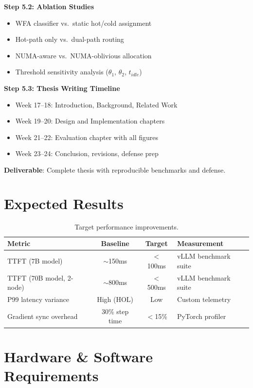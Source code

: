 \documentclass[10pt,letterpaper]{article}
\begin{document}
\textbf{Step 5.2: Ablation Studies}
\begin{itemize}[noitemsep]
    \item WFA classifier vs.\ static hot/cold assignment
    \item Hot-path only vs.\ dual-path routing
    \item NUMA-aware vs.\ NUMA-oblivious allocation
    \item Threshold sensitivity analysis ($\theta_1$, $\theta_2$, $t_{idle}$)
\end{itemize}

\textbf{Step 5.3: Thesis Writing Timeline}
\begin{itemize}[noitemsep]
    \item Week 17--18: Introduction, Background, Related Work
    \item Week 19--20: Design and Implementation chapters
    \item Week 21--22: Evaluation chapter with all figures
    \item Week 23--24: Conclusion, revisions, defense prep
\end{itemize}

\textbf{Deliverable}: Complete thesis with reproducible benchmarks and defense.

\section{Expected Results}

\begin{table}[h]
\centering
\small
\begin{tabular}{@{}lccl@{}}
\toprule
\textbf{Metric} & \textbf{Baseline} & \textbf{Target} & \textbf{Measurement} \\
\midrule
TTFT (7B model) & $\sim$150ms & $<$100ms & vLLM benchmark suite \\
TTFT (70B model, 2-node) & $\sim$800ms & $<$500ms & vLLM benchmark suite \\
P99 latency variance & High (HOL) & Low & Custom telemetry \\
Gradient sync overhead & 30\% step time & $<$15\% & PyTorch profiler \\
\bottomrule
\end{tabular}
\caption{Target performance improvements.}
\end{table}

\section{Hardware \& Software Requirements}
\end{document}
